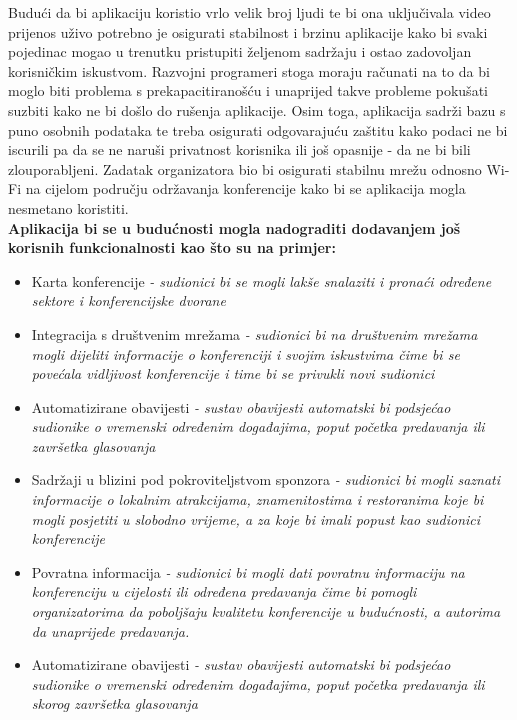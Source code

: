 		Budući da bi aplikaciju koristio vrlo velik broj ljudi te bi ona uključivala video prijenos uživo potrebno je osigurati stabilnost i brzinu aplikacije kako bi svaki pojedinac mogao u trenutku pristupiti željenom sadržaju i ostao zadovoljan korisničkim iskustvom. Razvojni programeri stoga moraju računati na to da bi moglo biti problema s prekapacitiranošću i unaprijed takve probleme pokušati suzbiti kako ne bi došlo do rušenja aplikacije. Osim toga, aplikacija sadrži bazu s puno osobnih podataka te treba osigurati odgovarajuću zaštitu kako podaci ne bi iscurili pa da se ne naruši privatnost korisnika ili još opasnije - da ne bi bili zlouporabljeni. Zadatak organizatora bio bi osigurati stabilnu mrežu odnosno Wi-Fi na cijelom području održavanja konferencije kako bi se aplikacija mogla nesmetano koristiti.\\
		
		\textbf{Aplikacija bi se u budućnosti mogla nadograditi dodavanjem još korisnih funkcionalnosti kao što su na primjer:}
		\begin{itemize}
			\item Karta konferencije
			\textit{- sudionici bi se mogli lakše snalaziti i pronaći određene sektore i konferencijske dvorane}
			\item Integracija s društvenim mrežama
			\textit{- sudionici bi na društvenim mrežama mogli dijeliti informacije o konferenciji i svojim iskustvima čime bi se povećala vidljivost konferencije i time bi se privukli novi sudionici}
			\item Automatizirane obavijesti
			\textit{- sustav obavijesti automatski bi podsjećao sudionike o vremenski određenim događajima, poput početka predavanja ili završetka glasovanja}
			\item Sadržaji u blizini pod pokroviteljstvom sponzora
			\textit{- sudionici bi mogli saznati informacije o lokalnim atrakcijama, znamenitostima i restoranima koje bi mogli posjetiti u slobodno vrijeme, a za koje bi imali popust kao sudionici konferencije}
			\item Povratna informacija
			\textit{- sudionici bi mogli dati povratnu informaciju na konferenciju u cijelosti ili određena predavanja čime bi pomogli organizatorima da poboljšaju kvalitetu konferencije u budućnosti, a autorima da unaprijede predavanja.}
			\item Automatizirane obavijesti
			\textit{- sustav obavijesti automatski bi podsjećao sudionike o vremenski određenim događajima, poput početka predavanja ili skorog završetka glasovanja}
		\end{itemize}
		
